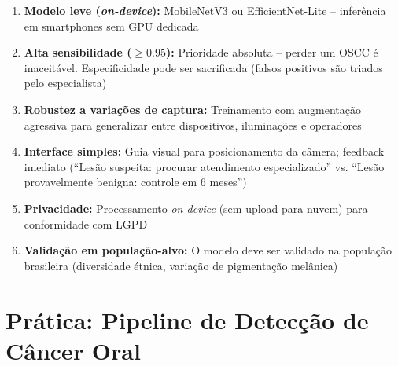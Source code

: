 \begin{enumerate}
  \item \textbf{Modelo leve (\textit{on-device}):} MobileNetV3 ou EfficientNet-Lite --
        inferência em smartphones sem GPU dedicada
  \item \textbf{Alta sensibilidade ($\geq 0.95$):} Prioridade absoluta -- perder
        um OSCC é inaceitável. Especificidade pode ser sacrificada (falsos positivos
        são triados pelo especialista)
  \item \textbf{Robustez a variações de captura:} Treinamento com augmentação
        agressiva para generalizar entre dispositivos, iluminações e operadores
  \item \textbf{Interface simples:} Guia visual para posicionamento da câmera;
        feedback imediato (``Lesão suspeita: procurar atendimento especializado''
        vs. ``Lesão provavelmente benigna: controle em 6 meses'')
  \item \textbf{Privacidade:} Processamento \textit{on-device} (sem upload para
        nuvem) para conformidade com LGPD
  \item \textbf{Validação em população-alvo:} O modelo deve ser validado na
        população brasileira (diversidade étnica, variação de pigmentação melânica)
\end{enumerate}


\section{Prática: Pipeline de Detecção de Câncer Oral}
\label{sec:pratica-cancer}

\nivelquatro

